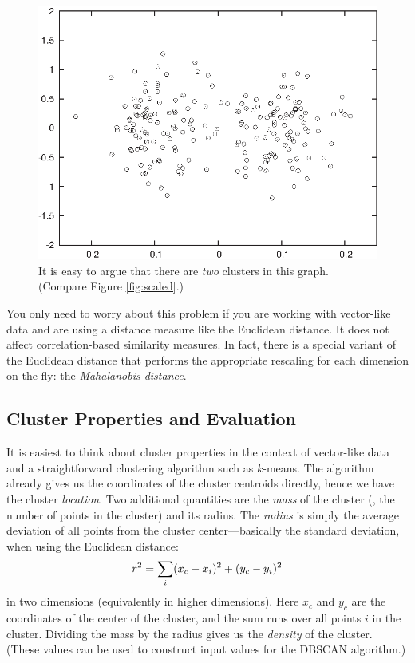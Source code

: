 \begin{figure}
  \centerline{\includegraphics{img/unscaled}}
  \caption{It is easy to argue that there are \emph{two} clusters 
    in this graph. (Compare Figure \ref{fig:scaled}.)}
  \label{fig:unscaled}\vspace*{-6pt}
\end{figure}


You only need to worry about this problem if you are working with
vector-like data and are using a distance measure like the Euclidean
distance. It does not affect correlation-based similarity measures.
In fact, there is a special variant of the Euclidean distance that
performs the appropriate rescaling for each dimension on the fly: the
\emph{Mahalanobis distance}.

      
\subsection{Cluster Properties and Evaluation}

It is easiest to think about cluster properties in the context of
vector-like data and a straightforward clustering algorithm\vadjust{\pagebreak} such as
$k$-means. The algorithm already gives us the coordinates of the
cluster centroids directly, hence we have the cluster \emph{location}.  
Two additional quantities are the \emph{mass}  of the
cluster (\ie, the number of points in the cluster) and its radius. The
\emph{radius}  is simply the average deviation of
all points from the cluster center---basically the standard deviation, when
using the Euclidean distance:\vspace*{-3pt}
%
\[
r^2 = \sum_i ( x_c - x_i )^2 + ( y_c - y_i )^2\vspace*{-3pt} 
\]
%
in two dimensions (equivalently in higher dimensions). Here $x_c$ and
$y_c$ are the coordinates of the center of the cluster, and the sum
runs over all points $i$ in the cluster. Dividing the mass by the
radius gives us the \emph{density}  of the cluster. (These values can
be used to construct input values for the DBSCAN algorithm.)

